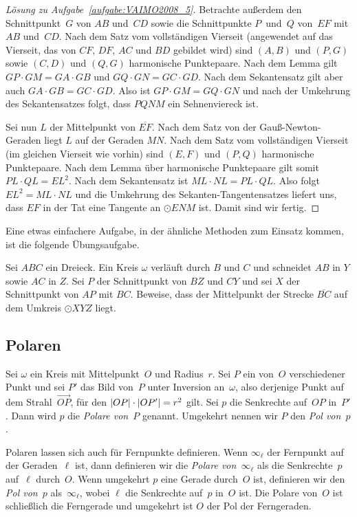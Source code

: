 \begin{proof}[Lösung zu Aufgabe~\ref{aufgabe:VAIMO2008_5}]
	Betrachte außerdem den Schnittpunkt~$G$ von $AB$ und~$CD$ sowie die Schnittpunkte $P$~und~$Q$ von~$EF$ mit $AB$ und~$CD$. Nach dem Satz vom vollständigen Vierseit (angewendet auf das Vierseit, das von $CF$, $DF$, $AC$ und $BD$ gebildet wird)
	sind $(A,B)$ und $(P,G)$ sowie $(C,D)$ und $(Q,G)$ harmonische Punktepaare. Nach dem Lemma gilt $GP\cdot GM=GA\cdot GB$ und $GQ\cdot GN=GC\cdot GD$. Nach dem Sekantensatz gilt aber auch $GA\cdot GB=GC\cdot GD$. Also ist $GP\cdot GM=GQ\cdot GN$ und nach der Umkehrung des Sekantensatzes folgt, dass $PQNM$ ein Sehnenviereck ist.
	
	Sei nun $L$ der Mittelpunkt von $\overline{EF}$. Nach dem Satz von der Gauß-Newton-Geraden liegt $L$ auf der Geraden $MN$. Nach dem Satz vom vollständigen Vierseit (im gleichen Vierseit wie vorhin) sind $(E,F)$ und $(P,Q)$ harmonische Punktepaare. Nach dem Lemma über harmonische Punktepaare gilt somit $PL\cdot QL=EL^2$. Nach dem Sekantensatz ist $ML\cdot NL=PL\cdot QL$. Also folgt $EL^2=ML\cdot NL$ und die Umkehrung des Sekanten-Tangentensatzes liefert uns, dass $EF$ in der Tat eine Tangente an $\odot ENM$ ist. Damit sind wir fertig.
\end{proof}
Eine etwas einfachere Aufgabe, in der ähnliche Methoden zum Einsatz kommen, ist die folgende Übungsaufgabe.
\begin{aufgabe*}
	Sei $ABC$ ein Dreieck. Ein Kreis $\omega$ verläuft durch $B$ und $C$ und schneidet $AB$ in $Y$ sowie $AC$ in $Z$. Sei $P$ der Schnittpunkt von $BZ$ und $CY$ und sei $X$ der Schnittpunkt von $AP$ mit $BC$. Beweise, dass der Mittelpunkt der Strecke $\overline{BC}$ auf dem Umkreis $\odot XYZ$ liegt.
\end{aufgabe*}


\subsection*{Polaren}
\begin{definition}
	Sei $\omega$ ein Kreis mit Mittelpunkt~$O$ und Radius~$r$. Sei $P$ ein von~$O$ verschiedener Punkt und sei $P'$ das Bild von~$P$ unter Inversion an~$\omega$, also derjenige Punkt auf dem Strahl~$\overrightarrow{OP}$, für den $\lvert OP\rvert\cdot \lvert OP'\rvert=r^2$ gilt. Sei $p$ die Senkrechte auf~$OP$ in~$P'$. Dann wird $p$ die \emph{Polare von~$P$} genannt. Umgekehrt nennen wir $P$ den \emph{Pol von~$p$}.
	
	Polaren lassen sich auch für Fernpunkte definieren. Wenn $\infty_\ell$ der Fernpunkt auf der Geraden~$\ell$ ist, dann definieren wir die \emph{Polare von~$\infty_\ell$} als die Senkrechte~$p$ auf~$\ell$ durch~$O$. Wenn umgekehrt $p$ eine Gerade durch~$O$ ist, definieren wir den \emph{Pol von~$p$} als~$\infty_\ell$, wobei $\ell$ die Senkrechte auf~$p$ in~$O$ ist. Die Polare von~$O$ ist schließlich die Ferngerade und umgekehrt ist $O$ der Pol der Ferngeraden. 
\end{definition}

